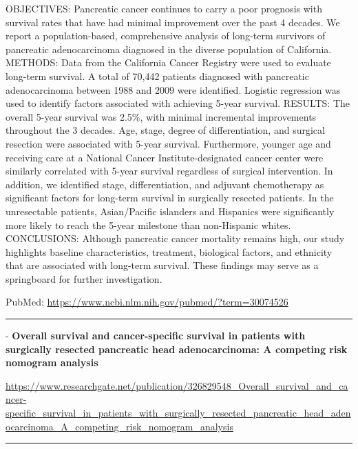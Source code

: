 \documentclass[]{article}
\begin{document}
OBJECTIVES: Pancreatic cancer continues to carry a poor prognosis with
survival rates that have had minimal improvement over the past 4
decades. We report a population-based, comprehensive analysis of
long-term survivors of pancreatic adenocarcinoma diagnosed in the
diverse population of California. METHODS: Data from the California
Cancer Registry were used to evaluate long-term survival. A total of
70,442 patients diagnosed with pancreatic adenocarcinoma between 1988
and 2009 were identified. Logistic regression was used to identify
factors associated with achieving 5-year survival. RESULTS: The overall
5-year survival was 2.5\%, with minimal incremental improvements
throughout the 3 decades. Age, stage, degree of differentiation, and
surgical resection were associated with 5-year survival. Furthermore,
younger age and receiving care at a National Cancer Institute-designated
cancer center were similarly correlated with 5-year survival regardless
of surgical intervention. In addition, we identified stage,
differentiation, and adjuvant chemotherapy as significant factors for
long-term survival in surgically resected patients. In the unresectable
patients, Asian/Pacific islanders and Hispanics were significantly more
likely to reach the 5-year milestone than non-Hispanic whites.
CONCLUSIONS: Although pancreatic cancer mortality remains high, our
study highlights baseline characteristics, treatment, biological
factors, and ethnicity that are associated with long-term survival.
These findings may serve as a springboard for further investigation.

PubMed: \url{https://www.ncbi.nlm.nih.gov/pubmed/?term=30074526}

{}

{}

\begin{center}\rule{0.5\linewidth}{\linethickness}\end{center}

 - \textbf{Overall survival and cancer-specific survival in patients
with surgically resected pancreatic head adenocarcinoma: A competing
risk nomogram analysis}

\url{https://www.researchgate.net/publication/326829548_Overall_survival_and_cancer-specific_survival_in_patients_with_surgically_resected_pancreatic_head_adenocarcinoma_A_competing_risk_nomogram_analysis}

\begin{center}\rule{0.5\linewidth}{\linethickness}\end{center}
\end{document}
